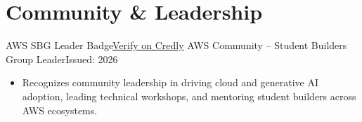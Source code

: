 \section*{Community \& Leadership}
\resumeSubHeadingListStart

\resumeSubheading
{AWS SBG Leader Badge}{\href{https://www.credly.com/badges/28d44865-cc97-4130-bd4e-8b81f242723f/public_url}{Verify on Credly}}
{AWS Community -- Student Builders Group Leader}{Issued: 2026}

\begin{itemize}
    \item Recognizes community leadership in driving cloud and generative AI adoption, leading technical workshops, and mentoring student builders across AWS ecosystems.
\end{itemize}

\resumeSubHeadingListEnd
